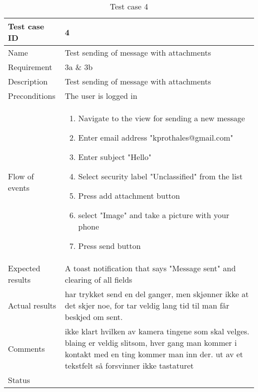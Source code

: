 \begin{table}
\begin{tabular}{l|p{10cm}}
Test case ID & 4 \\ \hline
Name & Test sending of message with attachments\\ \hline
Requirement & 3a \& 3b\\ \hline
Description & Test sending of message with attachments\\ \hline
Preconditions & The user is logged in\\ \hline
Flow of events & 
\begin{enumerate}
\item{}Navigate to the view for sending a new message
\item{}Enter email address "kprothales@gmail.com"
\item{}Enter subject "Hello"
\item{}Select security label "Unclassified" from the list
\item{}Press add attachment button
\item{}select "Image" and take a picture with your phone
\item{}Press send button
\end{enumerate} \\ \hline
Expected results & A toast notification that says "Message sent" and clearing of all fields\\ \hline \hline
Actual results & har trykket send en del ganger, men skjønner ikke at det skjer noe, for tar veldig lang tid til man får beskjed om sent.\\ \hline
Comments & ikke klart hvilken av kamera tingene som skal velges. blaing er veldig slitsom, hver gang man kommer i kontakt med en ting kommer man inn der. ut av et tekstfelt så forsvinner ikke tastaturet\\ \hline
Status & 
\end{tabular}
\caption{Test case 4} \label{tab:case4}
\end{table}

